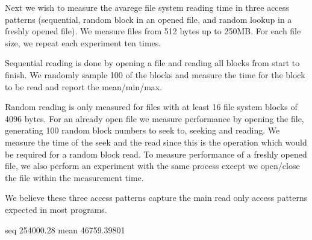 Next we wish to measure the avarege file system reading time in three access patterns (sequential, random block in an opened file, and random lookup in a freshly opened file).
We measure files from 512 bytes up to 250MB.
For each file size, we repeat each experiment ten times.

Sequential reading is done by opening a file and reading all blocks from start to finish.  We randomly sample 100 of the blocks and measure the time for the block to be read and report the mean/min/max.

Random reading is only measured for files with at least 16 file system blocks of 4096 bytes.
For an already open file we measure performance by opening the file, generating 100 random block numbers to seek to, seeking and reading.
We measure the time of the seek and the read since this is the operation which would be required for a random block read.
To measure performance of a freshly opened file, we also perform an experiment with the same process except we open/close the file within the measurement time.

We believe these three access patterns capture the main read only access patterns expected in most programs.

seq 254000.28 mean  46759.39801